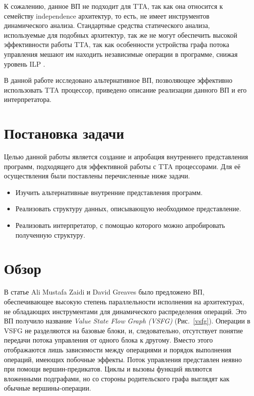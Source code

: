 \documentclass{matmex-diploma-custom}
\begin{document}
К сожалению, данное ВП не подходит для TTA, так как она относится к семейству independence архитектур, то есть, не имеет инструментов динамического анализа. Стандартные средства статического анализа, используемые для подобных архитектур, так же не могут обеспечить высокой эффективности работы TTA, так как особенности устройства графа потока управления мешают им находить независимые операции в программе, снижая уровень ILP \cite{vsfg}.

В данной работе исследовано альтернативное ВП, позволяющее эффективно использовать TTA процессор, приведено описание реализации данного ВП и его интерпретатора.

\section{Постановка задачи}
Целью данной работы является создание и апробация внутреннего представления программ, подходящего для эффективной работы с TTA процессорами. Для её осуществления были поставлены перечисленные ниже задачи.
\begin{itemize}
    \item Изучить альтернативные внутренние представления программ.
    \item Реализовать структуру данных, описывающую необходимое представление.
    \item Реализовать интерпретатор, с помощью которого можно апробировать полученную структуру.
\end{itemize}

\section{Обзор}

В статье Ali Mustafa Zaidi и David Greaves \cite{vsfg} было предложено ВП, обеспечивающее высокую степень параллельности исполнения на архитектурах, не обладающих инструментами для динамического распределения операций. Это ВП получило название \textit{Value State Flow Graph (VSFG)} (Рис.~\ref{vsfg}). Операции в VSFG не разделяются на базовые блоки, и, следовательно, отсутствует понятие передачи потока управления от одного блока к другому. Вместо этого отображаются лишь зависимости между операциями и порядок выполнения операций, имеющих побочные эффекты. Поток управления представлен неявно при помощи вершин-предикатов.  Циклы и вызовы функций являются вложенными подграфами, но со стороны родительского графа выглядят как обычные вершины-операции. 
\end{document}
